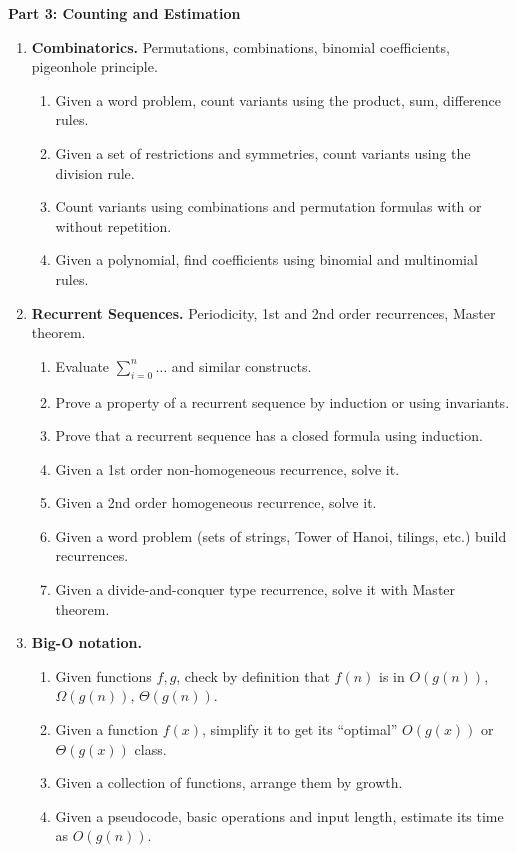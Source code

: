 \documentclass[a4paper,12pt]{article}
\begin{document}
\vspace{10pt}
{\bf Part 3: Counting and Estimation}


{\small
\begin{enumerate}
\item \textbf{Combinatorics.} Permutations, combinations, binomial coefficients, pigeonhole principle.
\begin{enumerate}
\item Given a word problem, count variants using the product, sum, difference rules.
\item Given a set of restrictions and symmetries, count variants using the division rule.
\item Count variants using
combinations and permutation formulas with or without repetition.
\item Given a polynomial, find coefficients using binomial and multinomial rules.
\end{enumerate}

\item \textbf{Recurrent Sequences.} Periodicity, 1st and 2nd order recurrences, Master theorem.
\begin{enumerate}
\item Evaluate $\sum\limits_{i=0}^n \ldots$ and similar constructs.
\item Prove a property of a recurrent sequence by induction or using invariants.
\item Prove that a recurrent sequence has a closed formula using induction.
\item Given a 1st order non-homogeneous recurrence, solve it.
\item Given a 2nd order homogeneous recurrence, solve it.
\item Given a word problem (sets of strings, Tower of Hanoi, tilings, etc.) build recurrences.
\item Given a divide-and-conquer type recurrence, solve it with Master theorem.
\end{enumerate}


\item \textbf{Big-O notation.}
\begin{enumerate}
\item Given functions $f,g$, check by definition that $f(n)$ is in $O(g(n))$, $\Omega(g(n))$, $\Theta(g(n))$.
\item Given a function $f(x)$, simplify it to get its ``optimal'' $O(g(x))$ or $\Theta(g(x))$ class.
\item Given a collection of functions, arrange them by growth.
\item Given a pseudocode, basic operations and input length, estimate its time as $O(g(n))$.
\end{enumerate}
\end{enumerate}
}
\end{document}
